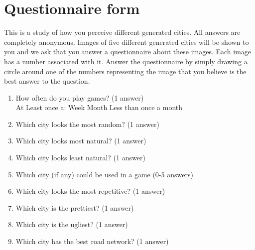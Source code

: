	\newpage
	\section{Questionnaire form} \label{ssssec:questionnaire}
	This is a study of how you perceive different generated cities. All answers are completely anonymous. Images of five different generated cities will be shown to you and we ask that you answer a questionnaire about these images. Each image has a number associated with it. Answer the questionnaire by simply drawing a circle around one of the numbers representing the image that you believe is the best answer to the question.
			
	\begin{enumerate}
		\item How often do you play games? (1 answer)\\
		At Least once a:	\tab Week \tab Month \tab Less than once a month
		
		\item Which city looks the most random? (1 answer)\\
		    
		
		\item Which city looks most natural? (1 answer)\\
		    
		
		\item Which city looks least natural? (1 answer)\\
		    
		
		\item Which city (if any) could be used in a game (0-5 answers)\\
		    
		
		\item Which city looks the most repetitive? (1 answer)\\
		    
		
		\item Which city is the prettiest? (1 answer)\\
		    
		
		\item Which city is the ugliest? (1 answer)\\
		    
		
		\item Which city has the best road network? (1 answer)\\
		    
	\end{enumerate}
	
	
	
	